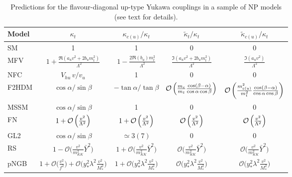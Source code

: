 \documentclass[../report.tex]{subfiles}
\begin{document}
\begin{table}[t]
\begin{center}
\begin{tabular}{l  c  c  c c  }
\toprule[0.1em]
Model	& $\kappa_t$ & $\kappa_{c (u)}/\kappa_t$  & $\tilde \kappa_t/\kappa_t$ & $\tilde \kappa_{c (u)}/\kappa_t$ \\ \midrule[0.05em]
SM	& 1	& 1 & 0 & 0 \\
MFV &$1+\frac{\Re(a_uv^2+2b_u m_t^2)}{\Lambda^2}$
&$1-\frac{2\Re(b_u)m_t^2}{\Lambda^2}$
&$\frac{\Im(a_uv^2+2b_u m_t^2)}{\Lambda^2}$ & $\frac{\Im(a_u
  v^2)}{\Lambda^2} $ \\
NFC & $V_{hu}\,v/v_u$	& 1 &  0 &0 \\
F2HDM & $\cos\alpha/\sin\beta$	& $-\tan\alpha/\tan\beta$ & $\mathcal{O}\left(\frac{m_c}{m_t}\frac{\cos(\beta-\alpha)}{\cos\alpha\cos\beta}\right)$ & $\mathcal{O}\left(\frac{m_{c(u)}^2}{m_t^2} \frac{\cos(\beta-\alpha)}{\cos\alpha\cos\beta}\right)$ \\
MSSM	& $\cos\alpha/\sin\beta$	&1 &0  &0\\
FN & $1+\mathcal{O}\left(\frac{v^2}{\Lambda^2}\right)$ &
	$1+\mathcal{O}\left(\frac{v^2}{\Lambda^2}\right)$ &
	$\mathcal{O}\left(\frac{v^2}{\Lambda^2}\right)$ &
	$\mathcal{O}\left(\frac{v^2}{\Lambda^2}\right)$ \\
GL2 	& $\cos\alpha/\sin\beta$& $\simeq 3(7)$ & 0 & 0 \\
RS &$1-{\mathcal O}\Big(\frac{ v^2}{m_{KK}^2}\bar Y^2\Big)$&$1+{\mathcal O}\Big(\frac{ v^2}{m_{KK}^2}\bar Y^2\Big)$ &${\mathcal O}\Big(\frac{ v^2}{m_{KK}^2}\bar Y^2\Big)$ &${\mathcal O}\Big(\frac{ v^2}{m_{KK}^2}\bar Y^2\Big)$ \\
pNGB & $1+{\mathcal O}\Big(\frac{ v^2}{f^2}\Big)+{\mathcal O}\Big(y_*^2 \lambda^2 \frac{ v^2}{M_*^2}\Big)$ & $1+{\mathcal O}\Big(y_*^2 \lambda^2 \frac{ v^2}{M_*^2}\Big)$ & ${\mathcal O}\Big(y_*^2 \lambda^2 \frac{ v^2}{M_*^2}\Big)$ & ${\mathcal O}\Big(y_*^2 \lambda^2 \frac{ v^2}{M_*^2}\Big)$ \\
\bottomrule[0.1em]
\end{tabular}
\caption{Predictions for the flavour-diagonal up-type Yukawa couplings
  in a sample of NP models (see text for details).
}
\label{tab:upyukawa}
\end{center}
\end{table}
\end{document}

